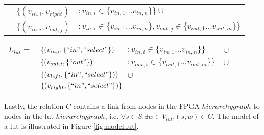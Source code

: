 \begin{defn}
\begin{itemize}
\begin{tabular}{lll}
&$\{(v_{in, i}, v_{right})$&$: v_{in, i} \in \{v_{in, 1} \dots v_{in, n}\}\} \cup$\\

&$\{(v_{in, i}, v_{out, j})$&$: v_{in, i} \in \{v_{in, 1} \dots v_{in, n}\}, v_{out, j} \in \{v_{out, 1} \dots v_{out, m}\}\}$\\

\end{tabular}

\begin{tabular}{llll}
$L_{lut}=$&$\{(v_{in, i}, \{``in", ``select"\})$&$: v_{in, i} \in \{v_{in, 1} \dots v_{in, n}\}\}$&$\cup$\\
&$\{(v_{out, i}, \{``out"\})$&$: v_{out, i} \in \{v_{out, 1} \dots v_{out, m}\}\}$&$\cup$\\
&$\{(v_{left}, \{``in", ``select"\})\}$&$\cup$&\\
&\multicolumn{2}{l}{$\{(v_{right}, \{``in", ``select"\})\}$}&\\
\end{tabular}

Lastly, the relation $C$ contains a link from nodes in the FPGA $hierarchygraph$ to nodes in the lut $hierarchygraph$, i.e. $\forall s \in S . \exists w \in V_{lut} . (s, w) \in C$.
The model of a lut is illustrated in Figure \ref{fig:model:lut}.

 
 \begin{figure}
\centering
\begin{adjustbox}{width=0.8\textwidth}
\end{adjustbox}
\end{figure}
\end{itemize}
\end{defn}
